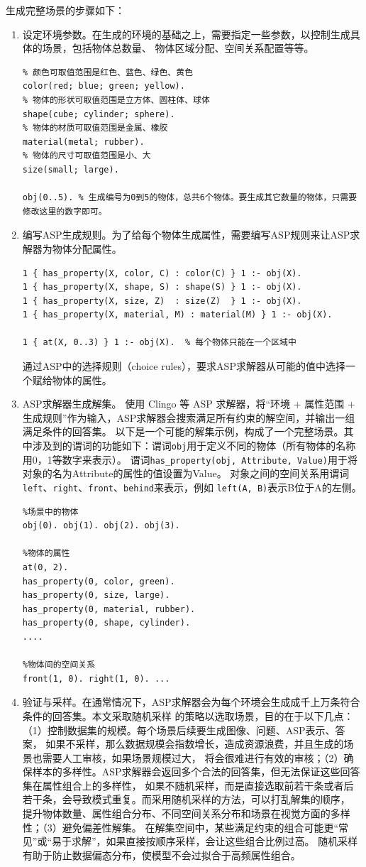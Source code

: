 生成完整场景的步骤如下：
\begin{enumerate}[nosep]
\item 设定环境参数。在生成的环境的基础之上，需要指定一些参数，以控制生成具体的场景，包括物体总数量、
物体区域分配、空间关系配置等等。
\begin{lstlisting}
% 颜色可取值范围是红色、蓝色、绿色、黄色
color(red; blue; green; yellow).
% 物体的形状可取值范围是立方体、圆柱体、球体
shape(cube; cylinder; sphere).
% 物体的材质可取值范围是金属、橡胶
material(metal; rubber).
% 物体的尺寸可取值范围是小、大
size(small; large).

obj(0..5). % 生成编号为0到5的物体，总共6个物体。要生成其它数量的物体，只需要修改这里的数字即可。
\end{lstlisting}
\item 编写ASP生成规则。为了给每个物体生成属性，需要编写ASP规则来让ASP求解器为物体分配属性。
\begin{lstlisting}
1 { has_property(X, color, C) : color(C) } 1 :- obj(X).
1 { has_property(X, shape, S) : shape(S) } 1 :- obj(X).
1 { has_property(X, size, Z)  : size(Z)  } 1 :- obj(X).
1 { has_property(X, material, M) : material(M) } 1 :- obj(X).

1 { at(X, 0..3) } 1 :- obj(X).  % 每个物体只能在一个区域中
\end{lstlisting}
通过ASP中的选择规则（choice rules），要求ASP求解器从可能的值中选择一个赋给物体的属性。
\item ASP求解器生成解集。
使用 Clingo 等 ASP 求解器，将“环境 + 属性范围 + 生成规则”作为输入，ASP求解器会搜索满足所有约束的解空间，并输出一组满足条件的回答集。
以下是一个可能的解集示例，构成了一个完整场景。其中涉及到的谓词的功能如下：谓词\texttt{obj}用于定义不同的物体（所有物体的名称用0，1等数字来表示）。
谓词\texttt{has\_property(obj, Attribute, Value)}用于将对象的名为Attribute的属性的值设置为Value。
对象之间的空间关系用谓词\texttt{left}、\texttt{right}、\texttt{front}、\texttt{behind}来表示，例如
\texttt{left(A, B)}表示B位于A的左侧。
\begin{lstlisting}
%场景中的物体
obj(0). obj(1). obj(2). obj(3).

%物体的属性
at(0, 2).
has_property(0, color, green).
has_property(0, size, large).
has_property(0, material, rubber).
has_property(0, shape, cylinder).
....

%物体间的空间关系
front(1, 0). right(1, 0). ...
\end{lstlisting}
\item 验证与采样。在通常情况下，ASP求解器会为每个环境会生成成千上万条符合条件的回答集。本文采取随机采样
的策略以选取场景，目的在于以下几点：（1）控制数据集的规模。每个场景后续要生成图像、问题、ASP表示、答案，
如果不采样，那么数据规模会指数增长，造成资源浪费，并且生成的场景也需要人工审核，如果场景规模过大，
将会很难进行有效的审核；（2）确保样本的多样性。ASP求解器会返回多个合法的回答集，但无法保证这些回答集在属性组合上的多样性，
如果不随机采样，而是直接选取前若干条或者后若干条，会导致模式重复。而采用随机采样的方法，可以打乱解集的顺序，
提升物体数量、属性组合分布、不同空间关系分布和场景在视觉方面的多样性；（3）避免偏差性解集。
在解集空间中，某些满足约束的组合可能更“常见”或“易于求解”，如果直接按顺序采样，会让这些组合比例过高。
随机采样有助于防止数据偏态分布，使模型不会过拟合于高频属性组合。


\end{enumerate}
